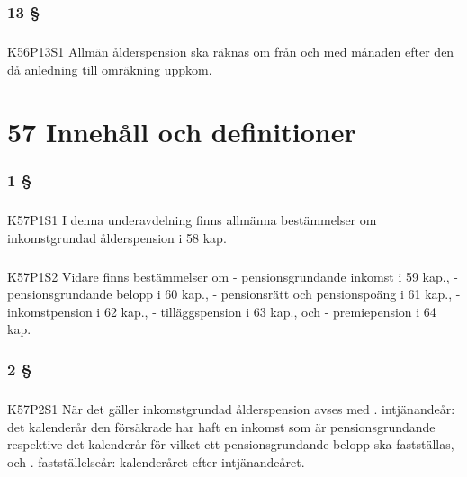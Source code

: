 \documentclass[a4paper,notitlepage,openany,10pt]{book}
\begin{document}
\subsection*{13 §}
\paragraph*{}
{\tiny K56P13S1}
Allmän ålderspension ska räknas om från och med månaden efter den då anledning till omräkning uppkom.
\chapter*{57 Innehåll och definitioner}
\subsection*{1 §}
\paragraph*{}
{\tiny K57P1S1}
I denna underavdelning finns allmänna bestämmelser om inkomstgrundad ålderspension i 58 kap.
\paragraph*{}
{\tiny K57P1S2}
Vidare finns bestämmelser om
\newline - pensionsgrundande inkomst i 59 kap.,
\newline - pensionsgrundande belopp i 60 kap.,
\newline - pensionsrätt och pensionspoäng i 61 kap.,
\newline - inkomstpension i 62 kap.,
\newline - tilläggspension i 63 kap., och
\newline - premiepension i 64 kap.
\subsection*{2 §}
\paragraph*{}
{\tiny K57P2S1}
När det gäller inkomstgrundad ålderspension avses med
. intjänandeår: det kalenderår den försäkrade har haft en inkomst som är pensionsgrundande respektive det kalenderår för vilket ett pensionsgrundande belopp ska fastställas, och
. fastställelseår: kalenderåret efter intjänandeåret.
\end{document}
